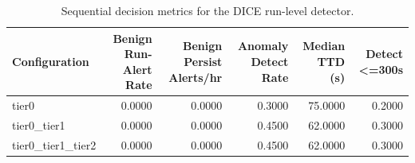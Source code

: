 \begin{table}[t]
\centering
\caption{Sequential decision metrics for the DICE run-level detector.}
\label{tab:dice_sequential_metrics}
\footnotesize
\begin{tabular}{lrrrrr}
\toprule
Configuration & Benign Run-Alert Rate & Benign Persist Alerts/hr & Anomaly Detect Rate & Median TTD (s) & Detect <=300s \\
\midrule
tier0 & 0.0000 & 0.0000 & 0.3000 & 75.0000 & 0.2000 \\
tier0_tier1 & 0.0000 & 0.0000 & 0.4500 & 62.0000 & 0.3000 \\
tier0_tier1_tier2 & 0.0000 & 0.0000 & 0.4500 & 62.0000 & 0.3000 \\
\bottomrule
\end{tabular}

\end{table}
